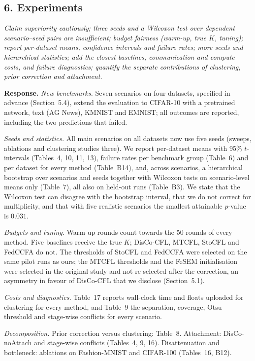 \documentclass[11pt]{article}
\newenvironment{revcomment}{\par\medskip\noindent\begin{minipage}{\linewidth}\color{blue!45!black}\itshape}{\end{minipage}\par\smallskip}
\newcommand{\resp}{\par\noindent\textbf{Response.} }
\begin{document}
\subsection*{6. Experiments}
\begin{revcomment}
Claim superiority cautiously; three seeds and a Wilcoxon test over dependent scenario--seed pairs are insufficient; budget fairness (warm-up, true $K$, tuning); report per-dataset means, confidence intervals and failure rates; more seeds and hierarchical statistics; add the closest baselines, communication and compute costs, and failure diagnostics; quantify the separate contributions of clustering, prior correction and attachment.
\end{revcomment}
\resp
\emph{New benchmarks.} Seven scenarios on four datasets, specified in advance (Section~5.4), extend the evaluation to CIFAR-10 with a pretrained network, text (AG News), KMNIST and EMNIST; all outcomes are reported, including the two predictions that failed.

\emph{Seeds and statistics.} All main scenarios on all datasets now use five seeds (sweeps, ablations and clustering studies three). We report per-dataset means with 95\% $t$-intervals (Tables~4, 10, 11, 13), failure rates per benchmark group (Table~6) and per dataset for every method (Table~B14), and, across scenarios, a hierarchical bootstrap over scenarios and seeds together with Wilcoxon tests on scenario-level means only (Table~7), all also on held-out runs (Table~B3). We state that the Wilcoxon test can disagree with the bootstrap interval, that we do not correct for multiplicity, and that with five realistic scenarios the smallest attainable $p$-value is $0.031$.

\emph{Budgets and tuning.} Warm-up rounds count towards the 50 rounds of every method. Five baselines receive the true $K$; DisCo-CFL, MTCFL, StoCFL and FedCCFA do not. The thresholds of StoCFL and FedCCFA were selected on the same pilot runs as ours; the MTCFL thresholds and the FeSEM initialisation were selected in the original study and not re-selected after the correction, an asymmetry in favour of DisCo-CFL that we disclose (Section~5.1).

\emph{Costs and diagnostics.} Table~17 reports wall-clock time and floats uploaded for clustering for every method, and Table~9 the separation, coverage, Otsu threshold and stage-wise conflicts for every scenario.

\emph{Decomposition.} Prior correction versus clustering: Table~8. Attachment: DisCo-noAttach and stage-wise conflicts (Tables~4, 9, 16). Disattenuation and bottleneck: ablations on Fashion-MNIST and CIFAR-100 (Tables~16, B12).
\end{document}
